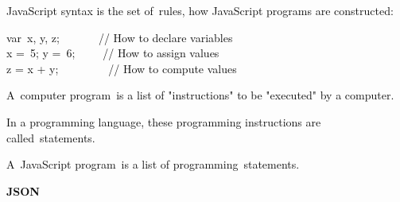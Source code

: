 \documentclass[12pt]{report}
\renewcommand{\_}{\kern-1.5pt\textunderscore\kern-1.5pt}
\begin{document}
\begin{adjustwidth}{0.3in}{0.84in}
\textcolor[HTML]{0D0D0D}{JavaScript syntax is the set of rules, how JavaScript programs are constructed:}\par

\end{adjustwidth}

\begin{adjustwidth}{0.3in}{0.84in}
\textcolor[HTML]{0D0D0D}{var x, y, z;       \tab // How to declare variables\\
x = 5; y = 6;     \tab // How to assign values\\
z = x + y;         \tab // How to compute values}\par

\end{adjustwidth}


\vspace{\baselineskip}
\begin{adjustwidth}{0.3in}{0.84in}
\textcolor[HTML]{0D0D0D}{A computer program is a list of "instructions" to be "executed" by a computer.}\par

\end{adjustwidth}

\begin{adjustwidth}{0.3in}{0.84in}
\textcolor[HTML]{0D0D0D}{In a programming language, these programming instructions are called statements.}\par

\end{adjustwidth}

\begin{adjustwidth}{0.3in}{0.84in}
\textcolor[HTML]{0D0D0D}{A JavaScript program is a list of programming statements.}\par

\end{adjustwidth}


\vspace{\baselineskip}
\begin{adjustwidth}{0.3in}{0.84in}
{\fontsize{14pt}{16.8pt}\selectfont \textbf{\textcolor[HTML]{0D0D0D}{JSON}}\par}\par

\end{adjustwidth}
\end{document}
